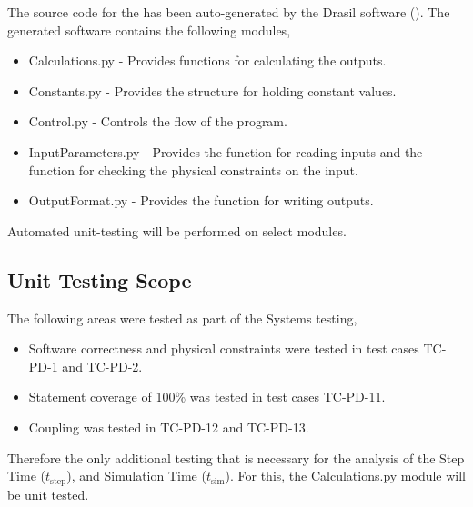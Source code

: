 \documentclass[12pt, titlepage]{article}
\begin{document}
The source code for the \progname{} has been auto-generated by the 
Drasil software (\cite{Drasil}). The generated software contains the following modules,

\begin{itemize}

\item Calculations.py  - Provides functions for calculating the outputs.

\item Constants.py  - Provides the structure for holding constant values.

\item Control.py  - Controls the flow of the program.

\item InputParameters.py - Provides the function for reading inputs and the function 
for checking the physical constraints on the input.

\item OutputFormat.py  -  Provides the function for writing outputs.

\end{itemize}

Automated unit-testing will be performed on select modules.

\subsection{Unit Testing Scope}


The following areas were tested as part of the Systems testing,

\begin{itemize}
\item Software correctness and physical constraints were tested in test cases TC-PD-1 and TC-PD-2.
\item Statement coverage of 100\% was tested in test cases TC-PD-11.
\item Coupling was tested in TC-PD-12 and TC-PD-13.
\end{itemize}

Therefore the only additional testing that is necessary for the analysis of the Step Time (${t_{\text{step}}}$),
and Simulation Time (${t_{\text{sim}}}$). For this, the Calculations.py module will be unit tested.
\end{document}
